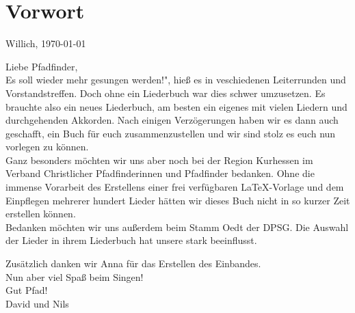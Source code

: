 \section*{Vorwort}

\begin{flushright} 
Willich, \today
\end{flushright}

Liebe Pfadfinder,\\

\glqq Es soll wieder mehr gesungen werden!", hieß es in veschiedenen Leiterrunden und Vorstandstreffen. 
Doch ohne ein Liederbuch war dies schwer umzusetzen. 
Es brauchte also ein neues Liederbuch, am besten ein eigenes mit vielen Liedern und durchgehenden Akkorden.
Nach einigen Verzögerungen haben wir es dann auch geschafft, ein Buch für euch zusammenzustellen und 
wir sind stolz es euch nun vorlegen zu können.\\

Ganz besonders möchten wir uns aber noch bei der Region Kurhessen im Verband Christlicher Pfadfinderinnen und Pfadfinder bedanken.
Ohne die immense Vorarbeit des Erstellens einer frei verfügbaren \LaTeX-Vorlage und dem Einpflegen mehrerer hundert Lieder 
hätten wir dieses Buch nicht in so kurzer Zeit erstellen können.\\

Bedanken möchten wir uns außerdem beim Stamm Oedt der DPSG. Die Auswahl der Lieder in ihrem Liederbuch hat unsere stark beeinflusst.

Zusätzlich danken wir Anna für das Erstellen des Einbandes.\\

Nun aber viel Spaß beim Singen!\\

Gut Pfad!\\

David und Nils\\
